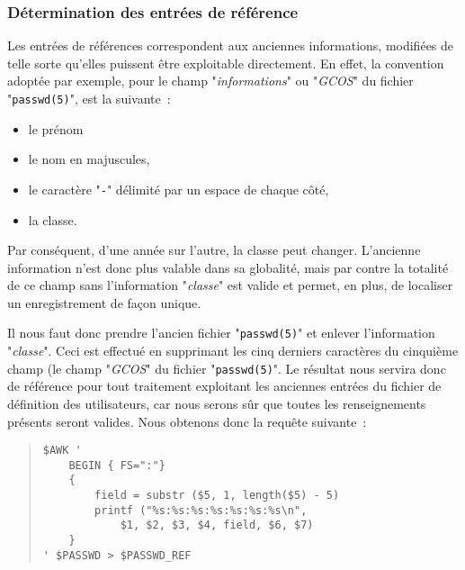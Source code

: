 \subsubsection{\label{adv-programming-ex3-devlref}D{\'e}termination des entr{\'e}es de r{\'e}f{\'e}rence}

Les entr{\'e}es de r{\'e}f{\'e}rences correspondent aux anciennes informations, modifi{\'e}es
de telle sorte qu'elles puissent {\^e}tre exploitable directement. En effet, la
convention adopt{\'e}e par exemple, pour le champ "{\sl informations}" ou
"{\sl GCOS}" du fichier "{\tt passwd(5)}", est la suivante~:
\begin{itemize}
	\item	le pr{\'e}nom
	\item	le nom en majuscules,
	\item	le caract{\`e}re "{\tt -}" d{\'e}limit{\'e} par un espace de chaque c{\^o}t{\'e},
	\item	la classe.
\end{itemize}
Par cons{\'e}quent, d'une ann{\'e}e sur l'autre, la classe peut changer. L'ancienne
information n'est donc plus valable dans sa globalit{\'e}, mais par contre
la totalit{\'e} de ce champ sans l'information "{\sl classe}" est valide et
permet, en plus, de localiser un enregistrement de fa\c{c}on unique.

Il nous faut donc prendre l'ancien fichier "{\tt passwd(5)}" et enlever
l'information "{\sl classe}". Ceci est effectu{\'e} en supprimant les cinq
derniers caract{\`e}res du cinqui{\`e}me champ (le champ "{\sl GCOS}" du fichier
"{\tt passwd(5)}". Le r{\'e}sultat nous servira donc de r{\'e}f{\'e}rence pour tout
traitement exploitant les anciennes entr{\'e}es du fichier de d{\'e}finition des
utilisateurs, car nous serons s{\^u}r que toutes les renseignements pr{\'e}sents seront
valides. Nous obtenons donc la requ{\^e}te suivante~:
\begin{quote}
\begin{verbatim}
$AWK '
    BEGIN { FS=":"}
    {
        field = substr ($5, 1, length($5) - 5)
        printf ("%s:%s:%s:%s:%s:%s:%s\n",
            $1, $2, $3, $4, field, $6, $7)
    }
' $PASSWD > $PASSWD_REF
\end{verbatim}
\end{quote}

